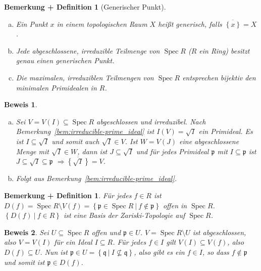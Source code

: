 \documentclass[a4paper,oneside]{scrbook}
\theoremstyle{break}
\newtheorem{BemDef}[Def]{Bemerkung + Definition}
\theoremstyle{nonumberbreak}
\theoremstyle{nonumberplain}
\newtheorem{Bew}{Beweis}
\theoremstyle{break}
\newcommand{\Spec}{%
	\ensuremath{\operatorname{Spec}}%
}
\newcommand{\closure}[1]{%
	\ensuremath{\overline{#1}}%
}
\newcommand{\rad}[1]{%
	\ensuremath{\sqrt{#1}}%
}
\begin{document}
\begin{BemDef}[Generischer Punkt]
	\begin{enumerate}[(a)]
		\item Ein Punkt $x$ in einem topologischen Raum $X$ heißt \emph{generisch}, falls $\closure{ \left\{x\right\} } = X$.
		\item Jede abgeschlossene, irreduzible Teilmenge von $\Spec R$ ($R$ ein Ring) besitzt genau einen generischen Punkt.
		\item Die maximalen, irreduziblen Teilmengen von $\Spec R$ entsprechen bijektiv den minimalen Primidealen in $R$.
	\end{enumerate}
\end{BemDef}
\begin{Bew}
	\begin{enumerate}[(a)]
		\item[(b)] Sei $V = V\left(I\right) \subseteq \Spec R$ abgeschlossen und irreduzibel.
		Nach Bemerkung~\ref{bem:irreducible-prime_ideal} ist $I\left(V\right) = \rad{I}$ ein Primideal.
		Es ist $I \subseteq \rad{I}$ und somit auch $\rad{I} \in V$. 
		Ist $W = V\left(J\right)$ eine abgeschlossene Menge mit $\rad{I} \in W$, dann ist $J \subseteq \rad{I}$ und für jedes
		Primideal $\mathfrak{p}$ mit $I \subseteq \mathfrak{p}$ ist $J \subseteq \rad{I} \subseteq \mathfrak{p}$
		$\Rightarrow \closure{ \left\{ \rad{I} \right\} } = V$.
		\item[(c)] Folgt aus Bemerkung~\ref{bem:irreducible-prime_ideal}.
	\end{enumerate}
\end{Bew}



\begin{BemDef}
	Für jedes $f \in R$ ist $D\left(f\right) = \Spec R \setminus V(f) = \left\{ \mathfrak{p} \in \Spec R\ |\ f \notin \mathfrak{p} \right\}$
	offen in $\Spec R$.
	$\left\{ D\left(f\right)\ |\ f \in R \right\}$ ist eine Basis der Zariski-Topologie auf $\Spec R$.
\end{BemDef}
\begin{Bew}
	Sei $U \subseteq \Spec R$ offen und $\mathfrak{p} \in U$.
	$V = \Spec R \setminus U$ ist abgeschlossen, also $V = V\left(I\right)$ für ein Ideal $I \subseteq R$.
	Für jedes $f \in I$ gilt $V\left(I\right) \subseteq V\left(f\right)$, also $D\left(f\right) \subseteq U$.
	Nun ist $\mathfrak{p} \in U = \left\{ \mathfrak{q}\ |\ I \nsubseteq \mathfrak{q} \right\}$, also gibt es ein $f \in I$, so dass $f \notin \mathfrak{p}$ und somit ist $\mathfrak{p} \in D\left(f\right)$.
\end{Bew}
\end{document}

